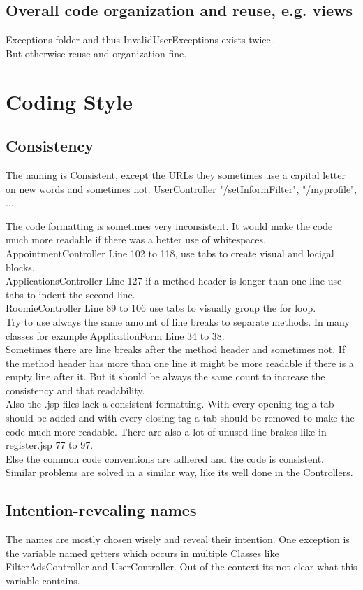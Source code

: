 \documentclass{scrreprt}
\begin{document}
\subsection{Overall code organization and reuse, e.g. views}
Exceptions folder and thus InvalidUserExceptions exists twice.\\
But otherwise reuse and organization fine.

\section{Coding Style}

\subsection{Consistency}
The naming is Consistent, except the URLs they sometimes use a capital letter on new words and sometimes not. UserController "/setInformFilter", "/myprofile", ... 

The code formatting is sometimes very inconsistent. It would make the code much more readable if there was a better use of whitespaces. 
AppointmentController Line 102 to 118, use tabs to create visual and locigal blocks.\\
ApplicationsController Line 127 if a method header is longer than one line use tabs to indent the second line. \\
RoomieController Line 89 to 106 use tabs to visually group the for loop.\\
Try to use always the same amount of line breaks to separate methods. In many classes for example ApplicationForm Line 34 to 38.\\
Sometimes there are line breaks after the method header and sometimes not. If the method header has more than one line it might be more readable if there is a empty line after it. But it should be always the same count to increase the consistency and that readability.\\
Also the .jsp files lack a consistent formatting. With every opening tag a tab should be added and with every closing tag a tab should be removed to make the code much more readable. There are also a lot of unused line brakes like in register.jsp 77 to 97. \\

Else the common code conventions are adhered and the code is consistent. Similar problems are solved in a similar way, like its well done in the Controllers. 

\subsection{Intention-revealing names}
The names are mostly chosen wisely and reveal their intention.  One exception is the variable named getters which occurs in multiple Classes like FilterAdsController and UserController. Out of the context its not clear what this variable contains. 
\end{document}

